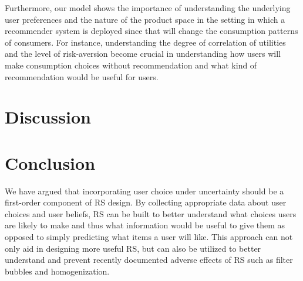 \documentclass[sigconf]{acmart}
\begin{document}
Furthermore, our model shows the importance of understanding the underlying user preferences and the nature of the product space in the setting in which a recommender system is deployed since that will change the consumption patterns of consumers. For instance, understanding the degree of correlation of utilities and the level of risk-aversion become crucial in understanding how users will make consumption choices without recommendation and what kind of recommendation would be useful for users.

\section{Discussion}

\section{Conclusion}

We have argued that incorporating user choice under uncertainty should be a first-order component of RS design. By collecting appropriate data about user choices and user beliefs, RS can be built to better understand what choices users are likely to make and thus what information would be useful to give them as opposed to simply predicting what items a user will like. This approach can not only aid in designing more useful RS, but can also be utilized to better understand and prevent recently documented adverse effects of RS such as filter bubbles and homogenization.



\end{document}
